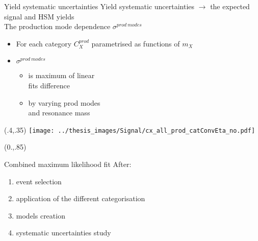 \documentclass[10pt,UKenglish, leqno, xcolor = dvipsnames]{beamer}
\begin{document}
	\begin{frame}{Yield systematic uncertainties}
		\vspace{.2cm}
		Yield systematic uncertainties $\to$ the expected signal and HSM yields\\
		The production mode dependence $\sigma^{prod\ modes}$
		\begin{itemize}
			\item For each category $C_X^{prod}$ parametrised as functions of $m_X$
			\item $\sigma^{prod\ modes}$
			\begin{itemize}
				\item is maximum of linear\\ fits difference
				\item by varying prod modes\\ and resonance mass
			\end{itemize}
		\end{itemize}
		\begin{textblock}{1}(.4,.35)
			\texttt{[image: ../thesis\_images/Signal/cx\_all\_prod\_catConvEta\_no.pdf]}\\	
		\end{textblock}	
		
		\begin{textblock}{1}(0.,.85)
			\begin{figure}
			\end{figure}
		\end{textblock}
	\end{frame}

	\begin{frame}{Combined maximum likelihood fit}
		After:
		\begin{enumerate}
			\item event selection 
			\item application of the different categorisation
			\item models creation
			\item systematic uncertainties study
		\end{enumerate}
	\end{frame}
	
\end{document}
